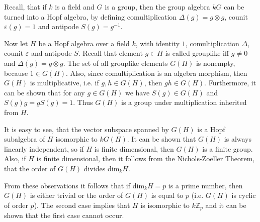 \documentclass[12pt]{article}
\begin{document}
Recall, that if $k$ is a field and $G$ is a group, then the group algebra $kG$ can be turned into a Hopf algebra, by defining comultiplication $\Delta(g)=g\otimes g$, counit $\varepsilon(g)=1$ and antipode $S(g)=g^{-1}$.

Now let $H$ be a Hopf algebra over a field $k$, with identity $1$, comultiplication $\Delta$, counit $\varepsilon$ and antipode $S$. Recall that element $g\in H$ is called grouplike iff $g\neq 0$ and $\Delta(g)=g\otimes g$. The set of all grouplike elements $G(H)$ is nonempty, because $1\in G(H)$. Also, since comultiplication is an algebra morphism, then $G(H)$ is multiplicative, i.e. if $g,h\in G(H)$, then $gh\in G(H)$. Furthermore, it can be shown that for any $g\in G(H)$ we have $S(g)\in G(H)$ and $S(g)g=gS(g)=1$. Thus $G(H)$ is a group under multiplication inherited from $H$.

It is easy to see, that the vector subspace spanned by $G(H)$ is a Hopf subalgebra of $H$ isomorphic to $kG(H)$. It can be shown that $G(H)$ is always linearly independent, so if $H$ is finite dimensional, then $G(H)$ is a finite group. Also, if $H$ is finite dimensional, then it follows from the Nichols-Zoeller Theorem, that the order of $G(H)$ divides $\mathrm{dim}_{k}H$. 

From these observations it follows that if $\mathrm{dim}_{k}H=p$ is a prime number, then $G(H)$ is either trivial or the order of $G(H)$ is equal to $p$ (i.e. $G(H)$ is cyclic of order $p$). The second case implies that $H$ is isomorphic to $k\mathbb{Z}_{p}$ and it can be shown that the first case cannot occur.
\end{document}
